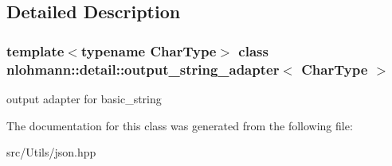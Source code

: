 \subsection{Detailed Description}
\subsubsection*{template$<$typename Char\+Type$>$\newline
class nlohmann\+::detail\+::output\+\_\+string\+\_\+adapter$<$ Char\+Type $>$}

output adapter for basic\+\_\+string 

The documentation for this class was generated from the following file\+:\begin{DoxyCompactItemize}
\item 
src/\+Utils/json.\+hpp\end{DoxyCompactItemize}
